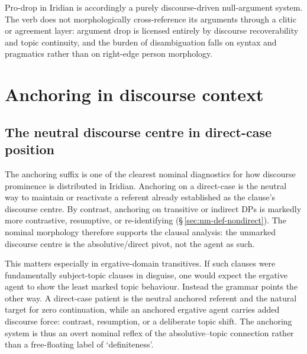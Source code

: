 Pro-drop in Iridian is accordingly a purely discourse-driven null-argument
system. The verb does not morphologically cross-reference its arguments through
a clitic or agreement layer: argument drop is licensed entirely by discourse
recoverability and topic continuity, and the burden of disambiguation falls on
syntax and pragmatics rather than on right-edge person morphology.

\section{Anchoring in discourse context}\label{sec:discourse-definiteness}


\subsection{The neutral discourse centre in direct-case position}
\label{sec:disc-def}

The anchoring suffix  is one of the clearest nominal diagnostics for
how discourse prominence is distributed in Iridian. Anchoring on a direct-case
 is the neutral way to maintain or reactivate a referent already
established as the clause's discourse centre. By contrast, anchoring on
transitive or indirect DPs is markedly more contrastive, resumptive, or
re-identifying (\S\,\ref{sec:nm-def-nondirect}). The nominal morphology
therefore supports the clausal analysis: the unmarked discourse centre is the
absolutive/direct pivot, not the agent as such.

This matters especially in ergative-domain transitives. If such clauses were
fundamentally subject-topic clauses in disguise, one would expect the ergative
agent to show the least marked topic behaviour. Instead the grammar points the
other way. A direct-case patient is the neutral anchored referent and the
natural target for zero continuation, while an anchored ergative agent carries
added discourse force: contrast, resumption, or a deliberate topic shift. The
anchoring system is thus an overt nominal reflex of the absolutive--topic
connection rather than a free-floating label of `definiteness'.

